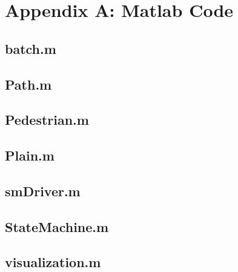 \documentclass[a4paper, DIV11, abstracton]{scrartcl}
\begin{document}
\newpage
\section{Appendix A: Matlab Code}
\subsection*{batch.m}

\subsection*{Path.m}

\subsection*{Pedestrian.m}

\subsection*{Plain.m}

\subsection*{smDriver.m}

\subsection*{StateMachine.m}

\subsection*{visualization.m}

\end{document}
